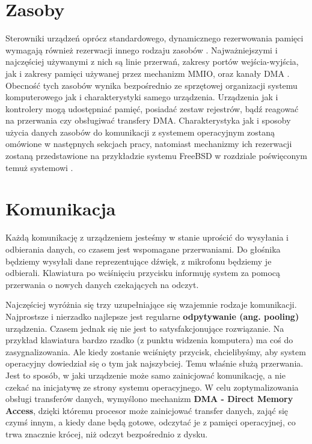 \documentclass[shortabstract,inz]{iithesis}
\begin{document}
\section{Zasoby} %
\label{sec:zasoby}

Sterowniki urządzeń oprócz standardowego, dynamicznego rezerwowania pamięci wymagają również rezerwacji
innego rodzaju zasobów \cite{zasoby2}. Najważniejszymi i najczęściej używanymi z nich są linie przerwań,  
zakresy portów wejścia-wyjścia, jak i zakresy pamięci używanej przez mechanizm MMIO, oraz kanały DMA 
\cite{book:linux_device_drivers}\cite{resource_h}.
Obecność tych zasobów wynika bezpośrednio ze sprzętowej organizacji systemu komputerowego jak i 
charakterystyki samego urządzenia. Urządzenia jak i kontrolery mogą udostępniać pamięć, posiadać zestaw rejestrów,
bądź reagować na przerwania czy obsługiwać transfery DMA.
Charakterystyka jak i sposoby użycia danych zasobów do komunikacji 
z systemem operacyjnym zostaną omówione w następnych sekcjach pracy, natomiast mechanizmy ich 
rezerwacji zostaną przedstawione na przykładzie systemu FreeBSD w rozdziale poświęconym temuż systemowi .

\section{Komunikacja} %

Każdą komunikację z urządzeniem jesteśmy w stanie uprościć do
wysyłania i odbierania danych, co czasem jest wspomagane przerwaniami.
Do głośnika będziemy wysyłali dane reprezentujące dźwięk, z mikrofonu będziemy je odbierali. 
Klawiatura po wciśnięciu przycisku informuję system za pomocą przerwania o nowych danych czekających na odczyt.

Najczęściej wyróżnia się trzy uzupełniające się wzajemnie rodzaje komunikacji. 
Najprostsze i nierzadko najlepsze jest regularne \textbf{odpytywanie (ang. pooling)} urządzenia.
Czasem jednak się nie jest to satysfakcjonujące rozwiązanie. Na przykład klawiatura bardzo rzadko 
(z punktu widzenia komputera) ma coś do zasygnalizowania. Ale kiedy zostanie wciśnięty przycisk, chcielibyśmy,
aby system operacyjny dowiedział się o tym jak najszybciej. Temu właśnie służą przerwania. Jest to sposób, w jaki 
urządzenie może samo zainicjować komunikację, a nie czekać na inicjatywę ze strony systemu operacyjnego. 
W celu zoptymalizowania obsługi transferów danych, wymyślono mechanizm \textbf{DMA - Direct Memory Access}, dzięki któremu
 procesor może zainicjować transfer danych, 
zająć się czymś innym, a kiedy dane będą gotowe, odczytać je z pamięci operacyjnej, 
co trwa znacznie krócej, niż odczyt bezpośrednio z dysku.
\end{document}
